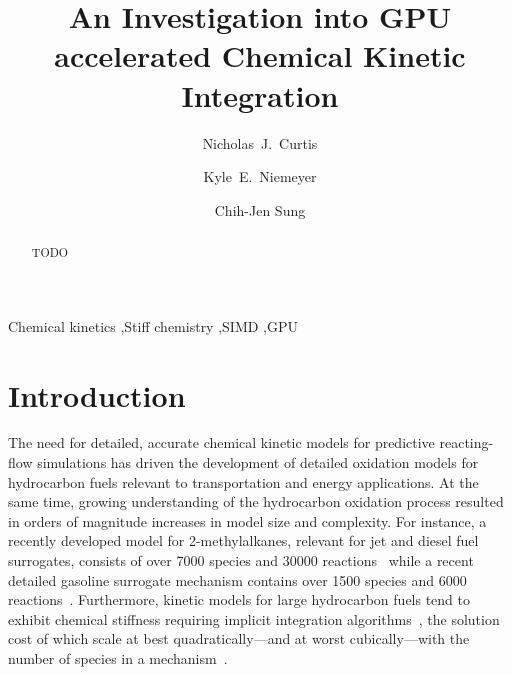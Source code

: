 \documentclass[preprint]{elsarticle}
\begin{document}
\begin{frontmatter}

\title{An Investigation into GPU accelerated Chemical Kinetic Integration}

\author[uconn]{Nicholas~J.\ Curtis}
\author[osu]{Kyle~E.\ Niemeyer}
\author[uconn]{Chih-Jen Sung}

\address[uconn]{Department of Mechanical Engineering\\
  University of Connecticut, Storrs, CT, 06269, USA}
\address[osu]{School of Mechanical, Industrial, and Manufacturing Engineering\\
  Oregon State University, Corvallis, OR 97331, USA}
  

\begin{abstract}
TODO
\end{abstract}

\begin{keyword}
 Chemical kinetics \sep Stiff chemistry \sep SIMD \sep GPU
\end{keyword}

\end{frontmatter}

\section{Introduction}
\label{sec:Intro}

The need for detailed, accurate chemical kinetic models for predictive reacting-flow simulations has driven the development of detailed oxidation models for hydrocarbon fuels relevant to transportation and energy applications.
At the same time, growing understanding of the hydrocarbon oxidation process resulted in orders of magnitude increases in model size and complexity.  
For instance, a recently developed model for 2-methylalkanes, relevant for jet and diesel fuel surrogates, consists of over 7000 species and 30000 reactions~\cite{Sarathy:2011kx} while a recent detailed gasoline surrogate mechanism contains over 1500 species and 6000 reactions~\cite{Mehl:2011jn}.
Furthermore, kinetic models for large hydrocarbon fuels tend to exhibit chemical stiffness requiring implicit integration algorithms~\cite{Lu:2009gh}, the solution cost of which scale at best quadratically---and at worst cubically---with the number of species in a mechanism~\cite{Lu:2009gh}.
\end{document}
